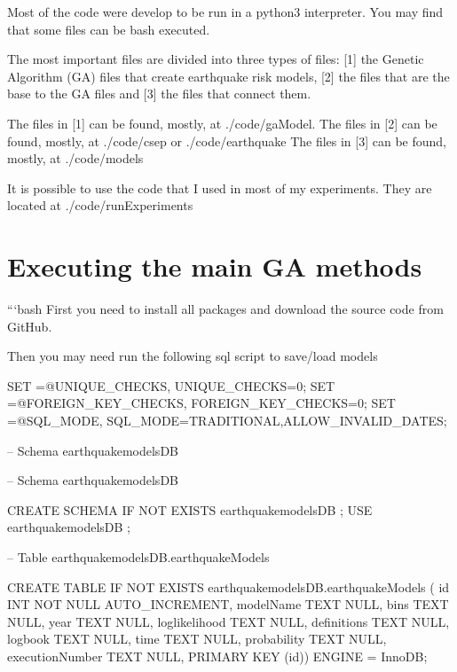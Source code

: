 Most of the code were develop to be run in a python3 interpreter. You may find that some files can be bash executed.

The most important files are divided into three types of files\+: \mbox{[}1\mbox{]} the Genetic Algorithm (GA) files that create earthquake risk models, \mbox{[}2\mbox{]} the files that are the base to the GA files and \mbox{[}3\mbox{]} the files that connect them.

The files in \mbox{[}1\mbox{]} can be found, mostly, at ./code/ga\+Model. The files in \mbox{[}2\mbox{]} can be found, mostly, at ./code/csep or ./code/earthquake The files in \mbox{[}3\mbox{]} can be found, mostly, at ./code/models

It is possible to use the code that I used in most of my experiments. They are located at ./code/run\+Experiments \section*{Executing the main GA methods}

```bash First you need to install all packages and download the source code from Git\+Hub.

Then you may need run the following sql script to save/load models

S\+ET =@U\+N\+I\+Q\+U\+E\+\_\+\+C\+H\+E\+C\+KS, U\+N\+I\+Q\+U\+E\+\_\+\+C\+H\+E\+C\+KS=0; S\+ET =@F\+O\+R\+E\+I\+G\+N\+\_\+\+K\+E\+Y\+\_\+\+C\+H\+E\+C\+KS, F\+O\+R\+E\+I\+G\+N\+\_\+\+K\+E\+Y\+\_\+\+C\+H\+E\+C\+KS=0; S\+ET =@S\+Q\+L\+\_\+\+M\+O\+DE, S\+Q\+L\+\_\+\+M\+O\+DE=\textquotesingle{}T\+R\+A\+D\+I\+T\+I\+O\+N\+AL,A\+L\+L\+O\+W\+\_\+\+I\+N\+V\+A\+L\+I\+D\+\_\+\+D\+A\+T\+ES\textquotesingle{};



 -- Schema earthquakemodels\+DB 





 -- Schema earthquakemodels\+DB 

 C\+R\+E\+A\+TE S\+C\+H\+E\+MA IF N\+OT E\+X\+I\+S\+TS {\ttfamily earthquakemodels\+DB} ; U\+SE {\ttfamily earthquakemodels\+DB} ;



 -- Table {\ttfamily earthquakemodels\+DB}.{\ttfamily earthquake\+Models} 

 C\+R\+E\+A\+TE T\+A\+B\+LE IF N\+OT E\+X\+I\+S\+TS {\ttfamily earthquakemodels\+DB}.{\ttfamily earthquake\+Models} ( {\ttfamily id} I\+NT N\+OT N\+U\+LL A\+U\+T\+O\+\_\+\+I\+N\+C\+R\+E\+M\+E\+NT, {\ttfamily model\+Name} T\+E\+XT N\+U\+LL, {\ttfamily bins} T\+E\+XT N\+U\+LL, {\ttfamily year} T\+E\+XT N\+U\+LL, {\ttfamily loglikelihood} T\+E\+XT N\+U\+LL, {\ttfamily definitions} T\+E\+XT N\+U\+LL, {\ttfamily logbook} T\+E\+XT N\+U\+LL, {\ttfamily time} T\+E\+XT N\+U\+LL, {\ttfamily probability} T\+E\+XT N\+U\+LL, {\ttfamily execution\+Number} T\+E\+XT N\+U\+LL, P\+R\+I\+M\+A\+RY K\+EY ({\ttfamily id})) E\+N\+G\+I\+NE = Inno\+DB;

